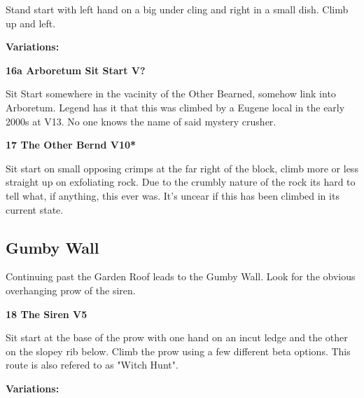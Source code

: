 \begin{multicols}{2}
			\begin{adjustwidth}{0.5cm}{}				
			Stand start with left hand on a big under cling and right in a small dish. Climb up and left.
			\end{adjustwidth}
				\begin{adjustwidth}{0.5cm}{}				
				\textbf{Variations:} \newline
					\label{vr:Arboretum Sit Start}
\colorbox{black!20}{
\parbox{0.95\linewidth}{
\textbf{
16a Arboretum Sit Start V?  
}
}
}

					\begin{adjustwidth}{0.5cm}{}				
					Sit Start somewhere in the vacinity of the Other Bearned, somehow link into Arboretum. Legend has it that this was climbed by a Eugene local in the early 2000s at V13. No one knows the name of said mystery crusher.
					\end{adjustwidth}
				\end{adjustwidth}
			\label{rt:The Other Bernd}
\colorbox{red!20}{
\parbox{0.95\linewidth}{
\textbf{
17 The Other Bernd V10*  
}
}
}

			\begin{adjustwidth}{0.5cm}{}				
			Sit start on small opposing crimps at the far right of the block, climb more or less straight up on exfoliating rock. Due to the crumbly nature of the rock its hard to tell what, if anything, this ever was. It's uncear if this has been climbed in its current state.
			\end{adjustwidth}
		\subsection*{Gumby Wall}\label{bf:Gumby Wall}
		Continuing past the Garden Roof leads to the Gumby Wall. Look for the obvious overhanging prow of the siren.\\
	
			\label{rt:The Siren}
\colorbox{RoyalBlue!20}{
\parbox{0.95\linewidth}{
\textbf{
18 The Siren V5  
}
}
}

			\begin{adjustwidth}{0.5cm}{}				
			Sit start at the base of the prow with one hand on an incut ledge and the other on the slopey rib below. Climb the prow using a few different beta options. This route is also refered to as "Witch Hunt".
			\end{adjustwidth}
				\begin{adjustwidth}{0.5cm}{}				
				\textbf{Variations:} \newline


\end{adjustwidth}
\end{multicols}

